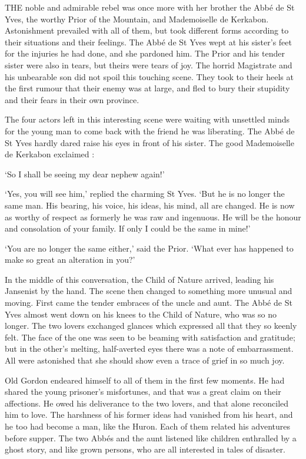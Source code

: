 \documentclass{article}
\begin{document}
\begin{center}
 

THE noble and admirable rebel was once more with her brother the Abbé de St Yves, 
the worthy Prior of the Mountain, and Mademoiselle de Kerkabon. Astonishment prevailed 
with all of them, but took different forms according to their situations and their 
feelings. The Abbé de St Yves wept at his sister's feet for the injuries he had 
done, and she pardoned him. The Prior and his tender sister were also in tears, 
but theirs were tears of joy. The horrid Magistrate and his unbearable son did 
not spoil this touching scene. They took to their heels at the first rumour that 
their enemy was at large, and fled to bury their stupidity and their fears in their 
own province. 

The four actors left in this interesting scene were waiting with unsettled minds 
for the young man to come back with the friend he was liberating. The Abbé de 
St Yves hardly dared raise his eyes in front of his sister. The good Mademoiselle 
de Kerkabon exclaimed : 

`So I shall be seeing my dear nephew again!' 

`Yes, you will see him,' replied the charming St Yves. `But he is no longer the 
same man. His bearing, his voice, his ideas, his mind, all are changed. He is now 
as worthy of respect as formerly he was raw and ingenuous. He will be the honour 
and consolation of your family. If only I could be the same in mine!' 

`You are no longer the same either,' said the Prior. `What ever has happened to 
make so great an alteration in you?' 

In the middle of this conversation, the Child of Nature arrived, leading his Jansenist 
by the hand. The scene then changed to something more unusual and moving. First 
came the tender embraces of the uncle and aunt. The Abbé de St Yves almost went 
down on his knees to the Child of Nature, who was so no longer. The two lovers 
exchanged glances which expressed all that they so keenly felt. The face of the 
one was seen to be beaming with satisfaction and gratitude; but in the other's 
melting, half-averted eyes there was a note of embarrassment. All were astonished 
that she should show even a trace of grief in so much joy. 

Old Gordon endeared himself to all of them in the first few moments. He had shared 
the young prisoner's misfortunes, and that was a great claim on their affections. 
He owed his deliverance to the two lovers, and that alone reconciled him to love. 
The harshness of his former ideas had vanished from his heart, and he too had become 
a man, like the Huron. Each of them related his adventures before supper. The two 
Abbés and the aunt listened like children enthralled by a ghost story, and like 
grown persons, who are all interested in tales of disaster. 


\end{center}
\end{document}
